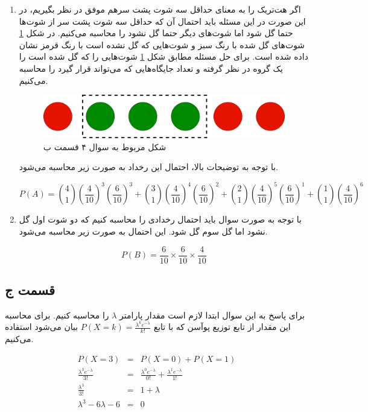 \documentclass[14pt,a4]{article}
\begin{document}
\begin{enumerate}[label=\alph* )]
    \item  اگر هت‌تریک را به معنای حداقل سه شوت پشت سرهم موفق در نظر بگیریم، در این صورت در این مسئله باید احتمال آن که حداقل سه شوت پشت سر از شوت‌ها حتما گل شود اما شوت‌های دیگر حتما
    گل نشود را محاسبه می‌کنیم. در شکل \ref{messi-hattrick} شوت‌های گل شده با رنگ سبز و شوت‌هایی که گل نشده است با رنگ
    قرمز نشان داده شده است. برای حل مسئله مطابق شکل \ref{messi-hattrick} شوت‌هایی را که گل شده است را یک گروه در نظر گرفته
    و تعداد جایگاه‌هایی که می‌تواند قرار گیرد را محاسبه می‌کنیم.

    \begin{figure}[h]
        \centering
        \includegraphics[width=0.5\linewidth]{images/q4/shoots.png}
        \caption{شکل مربوط به سوال ۴ قسمت ب}
        \label{messi-hattrick}
    \end{figure}

    با توجه به توضیحات بالا، احتمال این رخداد به صورت زیر محاسبه می‌شود.

    $$P(A) = \binom{4}{1} (\frac{4}{10})^3(\frac{6}{10})^3 +‌ \binom{3}{1} (\frac{4}{10})^4(\frac{6}{10})^2 +  \binom{2}{1} (\frac{4}{10})^5(\frac{6}{10})^1 + \binom{1}{1} (\frac{4}{10})^6$$

    \item با توجه به صورت سوال باید احتمال رخدادی را محاسبه کنیم که دو شوت اول گل نشود اما گل سوم
    گل شود. این احتمال به صورت زیر محاسبه می‌شود.

    $$P(B) = \frac{6}{10} \times \frac{6}{10} \times \frac{4}{10}$$
\end{enumerate}

\subsection*{قسمت ج}

برای پاسخ به این سوال ابتدا لازم است مقدار پارامتر $\lambda$ را محاسبه کنیم. برای محاسبه‌ این مقدار
از تابع توزیع پوآسن که با تابع $P(X=k)=\frac{\lambda^k e^{-\lambda}}{k!}$ بیان می‌شود استفاده می‌کنیم.

\begin{eqnarray*}
P(X=3) & = & P(X=0) + P(X=1) \\
\frac{\lambda^3 e^{-\lambda}}{3!} & = & \frac{\lambda^0 e^{-\lambda}}{0!} + \frac{\lambda^1 e^{-\lambda}}{1!} \\
\frac{\lambda^3}{3!} & = & 1 + \lambda \\
\lambda^3 - 6\lambda - 6 & = & 0
\end{eqnarray*}
\end{document}
